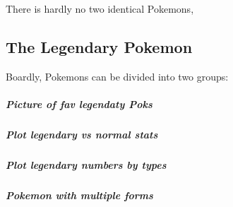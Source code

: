\documentclass[]{article}
\let\oldsubparagraph\subparagraph
\renewcommand{\subparagraph}[1]{\oldsubparagraph{#1}\mbox{}}
\begin{document}
There is hardly no two identical Pokemons,

\hypertarget{the-legendary-pokemon}{%
\subsection{\texorpdfstring{\textbf{The Legendary
Pokemon}}{The Legendary Pokemon}}\label{the-legendary-pokemon}}

Boardly, Pokemons can be divided into two groups:

\hypertarget{picture-of-fav-legendaty-poks}{%
\subparagraph{Picture of fav legendaty
Poks}\label{picture-of-fav-legendaty-poks}}

\hypertarget{plot-legendary-vs-normal-stats}{%
\subparagraph{Plot legendary vs normal
stats}\label{plot-legendary-vs-normal-stats}}

\hypertarget{plot-legendary-numbers-by-types}{%
\subparagraph{Plot legendary numbers by
types}\label{plot-legendary-numbers-by-types}}

\hypertarget{pokemon-with-multiple-forms}{%
\subparagraph{Pokemon with multiple
forms}\label{pokemon-with-multiple-forms}}
\end{document}
